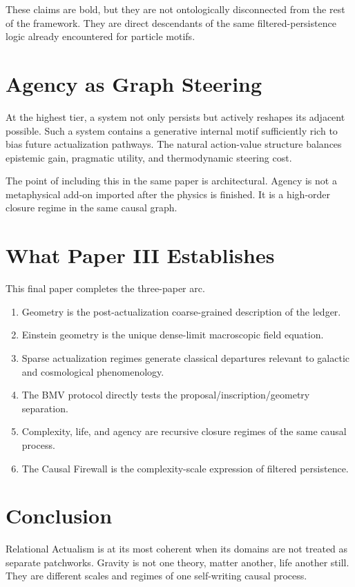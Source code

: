 \documentclass[11pt]{article}
\begin{document}
These claims are bold, but they are not ontologically disconnected from the rest of the framework. They are direct descendants of the same filtered-persistence logic already encountered for particle motifs.

\section{Agency as Graph Steering}
At the highest tier, a system not only persists but actively reshapes its adjacent possible. Such a system contains a generative internal motif sufficiently rich to bias future actualization pathways. The natural action-value structure balances epistemic gain, pragmatic utility, and thermodynamic steering cost.

The point of including this in the same paper is architectural. Agency is not a metaphysical add-on imported after the physics is finished. It is a high-order closure regime in the same causal graph.

\section{What Paper III Establishes}
This final paper completes the three-paper arc.
\begin{enumerate}[label=\arabic*.]
    \item Geometry is the post-actualization coarse-grained description of the ledger.
    \item Einstein geometry is the unique dense-limit macroscopic field equation.
    \item Sparse actualization regimes generate classical departures relevant to galactic and cosmological phenomenology.
    \item The BMV protocol directly tests the proposal/inscription/geometry separation.
    \item Complexity, life, and agency are recursive closure regimes of the same causal process.
    \item The Causal Firewall is the complexity-scale expression of filtered persistence.
\end{enumerate}

\section{Conclusion}
Relational Actualism is at its most coherent when its domains are not treated as separate patchworks. Gravity is not one theory, matter another, life another still. They are different scales and regimes of one self-writing causal process.
\end{document}
